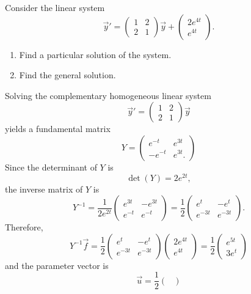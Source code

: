 \begin{example}
  Consider the linear system 
  \[
    \vec{y}'=
    \begin{pmatrix}
      1 & 2 \\
      2 & 1
    \end{pmatrix}\vec{y}+
    \begin{pmatrix}
      2e^{4t}\\e^{4t} 
    \end{pmatrix}.
  \]
  \begin{enumerate}
    \item 
    Find a particular solution of the system.
    \item
    Find the general solution.
  \end{enumerate}
\end{example}
\begin{solution}
  Solving the complementary homogeneous linear system
  \[
    \vec{y}'=
    \begin{pmatrix}
      1 & 2 \\
      2 & 1
    \end{pmatrix}\vec{y}  
  \]
  yields a fundamental matrix
  \[
  Y=\begin{pmatrix}
    e^{-t} & e^{3t}\\
    -e^{-t} &  e^{3t}.
  \end{pmatrix}  
  \]
  Since the determinant of $Y$ is
  \[
  \det(Y)  = 2 e^{2t},
  \]
  the inverse matrix of $Y$ is
  \[
  Y^{-1}=\frac{1}{2 e^{2t}}\begin{pmatrix}
    e^{3t} & -e^{3t}\\
    e^{-t} &  e^{-t}
  \end{pmatrix} = \frac{1}{2}\begin{pmatrix}
    e^{t} & -e^{t}\\
    e^{-3t} &  e^{-3t}
  \end{pmatrix}.
  \]
Therefore, 
\[
  Y^{-1}\vec{f}=\frac{1}{2}\begin{pmatrix}
    e^{t} & -e^{t}\\
    e^{-3t} &  e^{-3t}
  \end{pmatrix}\begin{pmatrix}
    2e^{4t}\\e^{4t} 
  \end{pmatrix}=\frac12\begin{pmatrix}
    e^{5t}\\ 3e^{t} 
  \end{pmatrix}
\]
and the parameter vector is
\[
    \vec{u}
    =\frac12\begin{pmatrix}

\end{pmatrix}\]
\end{solution}
